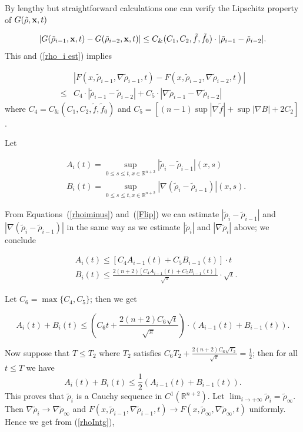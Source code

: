 By lengthy but straightforward calculations one can verify the
Lipschitz property of $G(\tilde{\rho},{\bf x},t)$

\[
|G(\tilde{\rho}_{i-1},{\bf x},t)-G(\tilde{\rho}_{i-2},{\bf x},t)|
\leq C_\&(C_1,C _2, \tilde{f},\tilde{f}_0) \cdot |
\tilde{\rho}_{i-1}-\tilde{\rho}_{i-2}|.
\]
This and (\ref{rho_i est}) implies

\begin{align}
& |F(x,
\tilde{\rho}_{i-1},\nabla\tilde{\rho}_{i-1},t)-F(x,\tilde{\rho}_{i-2},
\nabla\tilde{\rho}_{i-2},t)|
\nonumber \\
\leq &  C_4 \cdot | \tilde{\rho}_{i-1}-\tilde{\rho}_{i-2}| +C_5
\cdot |\nabla \tilde{\rho}_{i-1}- \nabla \tilde{\rho}_{i-2} |
\label{Flip}
\end{align}
where $C_4 = C_\&(C_1,C_2, \tilde{f},\tilde{f}_0)$ and $C_5 = [(n-1)
\sup |\nabla \tilde{f}| +\sup |\nabla B|+2C_2]$.

Let

\begin{align*}
& A_i(t)= \sup_{0 \leq s \leq t, x \in \mathbb{R}^{n+2}}
|\tilde{\rho}_i-
\tilde{\rho}_{i-1}|(x,s) \\
& B_i(t)=\sup_{0 \leq s \leq t,x \in \mathbb{R}^{n+2}}
|\nabla(\tilde{\rho}_i-
 \tilde{\rho}_{i-1})|(x,s).
\end{align*}

From Equations~(\ref{rhoiminus}) and~(\ref{Flip}) we can estimate
$|\tilde{\rho}_i- \tilde{\rho}_{i-1}|$ and $ |\nabla(\tilde{\rho}_i-
\tilde{\rho}_{i-1})|$ in the same way as we estimate
$|\tilde{\rho}_{i}|$ and $|\nabla\tilde{\rho}_i|$ above; we conclude

\begin{align*}
& A_i(t)\leq [ C_4  A_{i-1}(t) +C_5 B_{i-1}(t)] \cdot t  \\
& B_i(t) \leq \frac{2(n+2)[C_4  A_{i-1}(t) +C_5
B_{i-1}(t)]}{\sqrt{\pi}} \cdot \sqrt{t}.
\end{align*}

Let $C_6 = \max \{C_4,C_5 \}$; then we get

\[
A_i(t)+B_i(t) \leq \left( C_6t+ \frac{2(n+2)C_6
\sqrt{t}}{\sqrt{\pi}} \right) \cdot \left(  A_{i-1}(t)+B_{i-1}(t)
\right).
\]

Now suppose that $T\le T_2$ where $T_2$ satisfies  $C_6T_2+
\frac{2(n+2)C_6 \sqrt{T_2}}{\sqrt{\pi}} =\frac{1}{2}$; then for all
$t\le T$ we have
\[
A_i(t)+B_i(t) \leq \frac{1}{2} \left(  A_{i-1}(t)+B_{i-1}(t)
\right).
\]
This proves that $\tilde{\rho}_{i}$ is a Cauchy sequence in
$C^1(\mathbb{R}^{n+2})$. Let $\lim_{i \rightarrow +\infty}
\tilde{\rho}_{i} =\tilde{\rho}_{\infty}$. Then $\nabla
\tilde{\rho}_{i} \rightarrow \nabla \tilde{\rho}_{\infty}$ and
$F(x,\tilde{\rho}_{i-1},\nabla \tilde{\rho}_{i-1},t) \rightarrow
F(x, \tilde{\rho}_{\infty}, \nabla \tilde{\rho}_{\infty},t)$
uniformly. Hence we get from (\ref{rhoIntg}),

